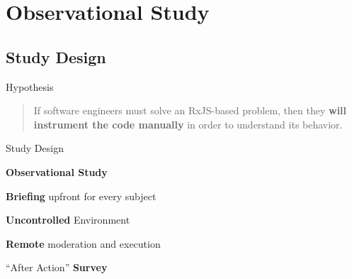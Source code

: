 \documentclass[aspectratio=169]{beamer}
\begin{document}
\section{Observational Study}
\subsection{Study Design}

\begin{frame}[fragile]{Hypothesis}
    \begin{quote}
        If software engineers must solve an RxJS-based problem, then they \textbf{will instrument the code manually} in order to understand its behavior.
    \end{quote}
\end{frame}


\begin{frame}{Study Design}
    \begin{vfilleditems}
        \item \textbf{Observational Study}
        \item \textbf{Briefing} upfront for every subject
        \item \textbf{Uncontrolled} Environment
        \item \textbf{Remote} moderation and execution
        \item ``After Action'' \textbf{Survey}
    \end{vfilleditems}
\end{frame}

\end{document}
